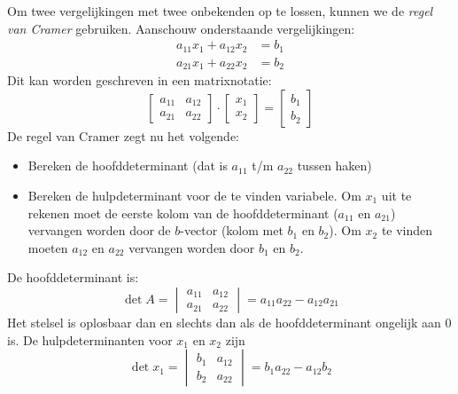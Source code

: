 Om twee vergelijkingen met twee onbekenden op te lossen, kunnen we de \textsl{regel van Cramer} gebruiken. Aanschouw onderstaande vergelijkingen:
%
\begin{equation}
\begin{split}
a_{11}x_1 + a_{12}x_2 &= b_1 \\
a_{21}x_1 + a_{22}x_2 &= b_2
\end{split}
\end{equation}
%
Dit kan worden geschreven in een matrixnotatie:
%
\begin{equation}
\begin{bmatrix}
a_{11} & a_{12} \\
a_{21} & a_{22}
\end{bmatrix} \cdot
\begin{bmatrix}
x_1 \\
x_2
\end{bmatrix} =
\begin{bmatrix}
b_1 \\
b_2
\end{bmatrix}
\end{equation}
%
De regel van Cramer zegt nu het volgende:
\begin{itemize}
\item Bereken de hoofddeterminant (dat is $a_{11}$ t/m $a_{22}$ tussen haken)
\item Bereken de hulpdeterminant voor de te vinden variabele. Om $x_1$ uit te rekenen moet de eerste
kolom van de hoofddeterminant ($a_{11}$ en $a_{21}$) vervangen worden door de $b$-vector (kolom met
$b_1$ en $b_2$). Om $x_2$ te vinden moeten $a_{12}$ en $a_{22}$ vervangen worden door $b_1$ en $b_2$.
\end{itemize}
%
De hoofddeterminant is:
%
\begin{equation}
\det A = \begin{vmatrix}
a_{11} & a_{12} \\
a_{21} & a_{22}
\end{vmatrix} = a_{11}a_{22} - a_{12}a_{21}
\end{equation}
%
Het stelsel is oplosbaar dan en slechts dan als de hoofddeterminant ongelijk aan 0 is.
%
De hulpdeterminanten voor $x_1$ en $x_2$ zijn
%
\begin{equation}
\det x_1 = \begin{vmatrix}
b_{1} & a_{12} \\
b_{2} & a_{22}
\end{vmatrix} = b_{1}a_{22} - a_{12}b_{2}
\end{equation}
%
